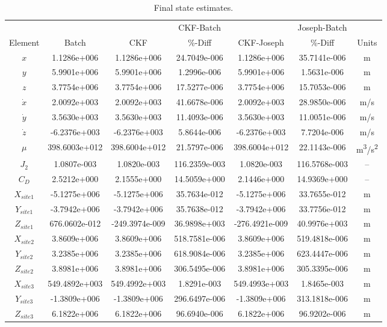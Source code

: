 \documentclass[]{aiaa-tc}%
\begin{document}
	\begin{table}[H]%
		\begin{center}
			\caption{Final state estimates.}
			\label{t:FinalStates}
			\begin{tabular}{c|c|c|c|c|c|c}
\hline &  &  & CKF-Batch &  & Joseph-Batch & \\
Element & Batch & CKF & \%-Diff & CKF-Joseph & \%-Diff & Units\\ \hline
$x$         & 1.1286e+006   & 1.1286e+006    &     24.7049e-006 & 1.1286e+006    &     35.7141e-006 & m\\
$y$         & 5.9901e+006   & 5.9901e+006    &      1.2996e-006 & 5.9901e+006    &      1.5631e-006 & m\\
$z$         & 3.7754e+006   & 3.7754e+006    &     17.5277e-006 & 3.7754e+006    &     15.7053e-006 & m\\
$\dot{x}$   & 2.0092e+003   & 2.0092e+003    &     41.6678e-006 & 2.0092e+003    &     28.9850e-006 & m/s\\
$\dot{y}$   & 3.5630e+003   & 3.5630e+003    &     11.4093e-006 & 3.5630e+003    &     11.0051e-006 & m/s\\
$\dot{z}$   & -6.2376e+003  & -6.2376e+003   &      5.8644e-006 & -6.2376e+003   &      7.7204e-006 & m/s\\
$\mu$       & 398.6003e+012 & 398.6004e+012  &     21.5797e-006 & 398.6004e+012  &     22.1143e-006 & m\textsuperscript{3}/s\textsuperscript{2}\\
$J_2$       & 1.0807e-003   & 1.0820e-003    &    116.2359e-003 & 1.0820e-003    &    116.5768e-003 & --\\
$C_D$       & 2.5212e+000   & 2.1555e+000    &     14.5059e+000 & 2.1446e+000    &     14.9369e+000 & --\\
$X_{site1}$ & -5.1275e+006  & -5.1275e+006   &     35.7634e-012 & -5.1275e+006   &     33.7655e-012 & m\\
$Y_{site1}$ & -3.7942e+006  & -3.7942e+006   &     35.7638e-012 & -3.7942e+006   &     33.7756e-012 & m\\
$Z_{site1}$ & 676.0602e-012 & -249.3974e-009 &     36.9898e+003 & -276.4921e-009 &     40.9976e+003 & m\\
$X_{site2}$ & 3.8609e+006   & 3.8609e+006    &    518.7581e-006 & 3.8609e+006    &    519.4818e-006 & m\\
$Y_{site2}$ & 3.2385e+006   & 3.2385e+006    &    618.9084e-006 & 3.2385e+006    &    623.4447e-006 & m\\
$Z_{site2}$ & 3.8981e+006   & 3.8981e+006    &    306.5495e-006 & 3.8981e+006    &    305.3395e-006 & m\\
$X_{site3}$ & 549.4892e+003 & 549.4992e+003  &      1.8291e-003 & 549.4993e+003  &      1.8465e-003 & m\\
$Y_{site3}$ & -1.3809e+006  & -1.3809e+006   &    296.6497e-006 & -1.3809e+006   &    313.1818e-006 & m\\
$Z_{site3}$ & 6.1822e+006   & 6.1822e+006    &     96.6940e-006 & 6.1822e+006    &     96.9202e-006 & m\\			
			\end{tabular}
		\end{center}
	\end{table}  
\end{document}
